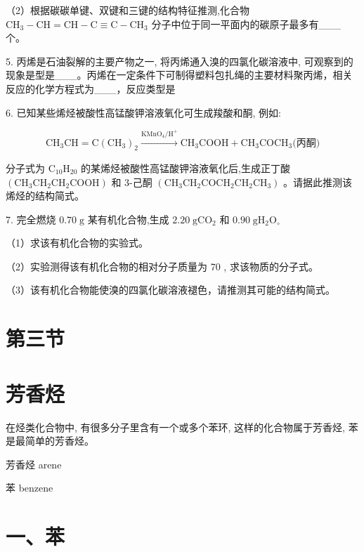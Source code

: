 \documentclass[10pt]{article}
\begin{document}
（2）根据碳碳单键、双键和三键的结构特征推测,化合物 \({\mathrm{{CH}}}_{3} - \mathrm{{CH}} = \mathrm{{CH}} - \mathrm{C} \equiv \mathrm{C} - {\mathrm{{CH}}}_{3}\) 分子中位于同一平面内的碳原子最多有\_\_\_个。

5. 丙烯是石油裂解的主要产物之一, 将丙烯通入溴的四氯化碳溶液中, 可观察到的现象是型是\_\_\_。丙烯在一定条件下可制得塑料包扎绳的主要材料聚丙烯，相关反应的化学方程式为\_\_\_，反应类型是

6. 已知某些烯烃被酸性高锰酸钾溶液氧化可生成羧酸和酮, 例如:

\[
{\mathrm{{CH}}}_{3}\mathrm{{CH}} = \mathrm{C}{\left( {\mathrm{{CH}}}_{3}\right) }_{2}\xrightarrow[]{{\mathrm{{KMnO}}}_{4}/{\mathrm{H}}^{ + }}{\mathrm{{CH}}}_{3}\mathrm{{COOH}} + {\mathrm{{CH}}}_{3}{\mathrm{{COCH}}}_{3}\text{(丙酮)}
\]

分子式为 \({\mathrm{C}}_{10}{\mathrm{H}}_{20}\) 的某烯烃被酸性高锰酸钾溶液氧化后,生成正丁酸 \(\left( {{\mathrm{{CH}}}_{3}{\mathrm{{CH}}}_{2}{\mathrm{{CH}}}_{2}\mathrm{{COOH}}}\right)\) 和 3-己酮 \(\left( {{\mathrm{{CH}}}_{3}{\mathrm{{CH}}}_{2}{\mathrm{{COCH}}}_{2}{\mathrm{{CH}}}_{2}{\mathrm{{CH}}}_{3}}\right)\) 。请据此推测该烯烃的结构简式。

7. 完全燃烧 \({0.70}\mathrm{\;g}\) 某有机化合物,生成 \({2.20}\mathrm{\;g}{\mathrm{{CO}}}_{2}\) 和 \({0.90}\mathrm{\;g}{\mathrm{H}}_{2}{\mathrm{O}}_{ \circ }\)

（1）求该有机化合物的实验式。

（2）实验测得该有机化合物的相对分子质量为 70 , 求该物质的分子式。

（3）该有机化合物能使溴的四氯化碳溶液褪色，请推测其可能的结构简式。

\section*{第三节}

\section*{芳香烃}

在烃类化合物中, 有很多分子里含有一个或多个苯环, 这样的化合物属于芳香烃, 苯是最简单的芳香烃。

\begin{mdframed}

芳香烃 arene

苯 benzene

\end{mdframed}

\section*{一、苯}
\end{document}
